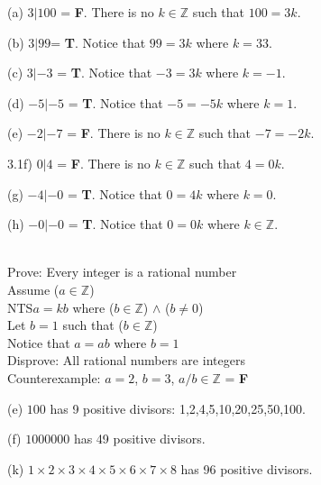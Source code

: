\documentclass[12pt]{article}
\begin{document}
(a) $3|100$ = \textbf{F}.  There is no $k \in \mathbb{Z}$ such that $100 = 3k$.
\vspace{.15in}

(b) $3|99$= \textbf{T}.  Notice that $99 = 3k$ where $k = 33$.  
\vspace{.15in}

(c) $3|-3$ = \textbf{T}.  Notice that $-3 = 3k$ where $k=-1$.
\vspace{.15in}

(d) $-5|-5$ = \textbf{T}.  Notice that $-5 = -5k$ where $k=1$.
\vspace{.15in}

(e) $-2|-7$ = \textbf{F}.  There is no $k \in \mathbb{Z}$ such that $-7 = -2k$.
\vspace{.15in}

\noindent 3.1f) $0|4$ = \textbf{F}.  There is no $k \in \mathbb{Z}$ such that $4 = 0k$.
\vspace{.15in}

(g) $-4|-0$ = \textbf{T}.  Notice that $0 = 4k$ where $k=0$.
\vspace{.15in}

(h) $-0|-0$ = \textbf{T}.  Notice that $0 = 0k$ where $k \in \mathbb{Z}$.
\vspace{.3in}

 \\
Prove: Every integer is a rational number\\
Assume ($a \in \mathbb{Z}$) \\ 
NTS\;$a=kb$ where ($b \in \mathbb{Z}$)   $\wedge$ ($b \neq 0$)\\
Let $b=1$ such that ($b \in \mathbb{Z}$) \\
Notice that $a = ab$ where $b=1$ $ $\\
Disprove: All rational numbers are integers\\
Counterexample: $a=2$, $b=3$, $a/b\in \mathbb{Z}$ = \textbf{F} $ $\\
\vspace{.3in}

(e) $100$ has 9 positive divisors: 1,2,4,5,10,20,25,50,100.
\vspace{.15in}

(f) $1000000$ has 49 positive divisors.
\vspace{.15in}

(k) $1\times2\times3\times4\times5\times6\times7\times8$ has 96 positive divisors.
\vspace{.15in}
\end{document}
